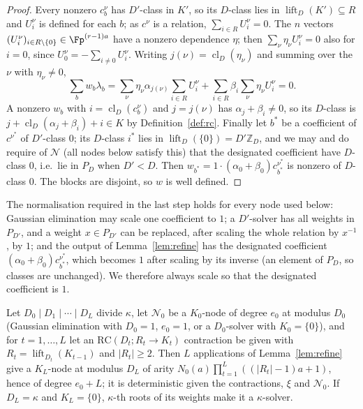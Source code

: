 \begin{proof}
Every nonzero $c^\nu_b$ has $D'$-class in $K'$, so its $D$-class lies in $\operatorname{lift}_D(K') \subseteq R$ and $U^\nu_i$ is defined for each $b$; as $c^\nu$ is a relation, $\sum_{i\in R}U^\nu_i = 0$. The $n$ vectors $(U^\nu_i)_{i \in R\setminus\{0\}} \in \Fp^{(r-1)a}$ have a nonzero dependence $\eta$; then $\sum_\nu\eta_\nu U^\nu_i = 0$ also for $i = 0$, since $U^\nu_0 = -\sum_{i\ne0}U^\nu_i$. Writing $j(\nu) = \operatorname{cl}_D(\eta_\nu)$ and summing over the $\nu$ with $\eta_\nu \ne 0$,
\[
  \sum_b w_b\lambda_b = \sum_\nu\eta_\nu\alpha_{j(\nu)}\sum_{i\in R}U^\nu_i + \sum_{i\in R}\beta_i\sum_\nu\eta_\nu U^\nu_i = 0 .
\]
A nonzero $w_b$ with $i = \operatorname{cl}_D(c^\nu_b)$ and $j = j(\nu)$ has $\alpha_j + \beta_i \ne 0$, so its $D$-class is $j + \operatorname{cl}_D(\alpha_j+\beta_i) + i \in K$ by Definition~\ref{def:rc}. Finally let $b^\ast$ be a coefficient of $c^{\nu^\ast}$ of $D'$-class $0$; its $D$-class $i^\ast$ lies in $\operatorname{lift}_D(\{0\}) = D'\mathbb{Z}_D$, and we may and do require of $\mathcal N$ (all nodes below satisfy this) that the designated coefficient have $D$-class $0$, i.e.\ lie in $P_D$ when $D' < D$. Then $w_{b^\ast} = 1\cdot(\alpha_0+\beta_0)c^{\nu^\ast}_{b^\ast}$ is nonzero of $D$-class $0$. The blocks are disjoint, so $w$ is well defined.
\end{proof}

\begin{remark}
\label{rem:designated}
The normalisation required in the last step holds for every node used below: Gaussian elimination may scale one coefficient to $1$; a $D'$-solver has all weights in $P_{D'}$, and a weight $x \in P_{D'}$ can be replaced, after scaling the whole relation by $x^{-1}$, by $1$; and the output of Lemma~\ref{lem:refine} has the designated coefficient $(\alpha_0+\beta_0)c^{\nu^\ast}_{b^\ast}$, which becomes $1$ after scaling by its inverse (an element of $P_D$, so classes are unchanged). We therefore always scale so that the designated coefficient is $1$.
\end{remark}

\begin{corollary}[Chains]
\label{cor:chain}
Let $D_0 \mid D_1 \mid \cdots \mid D_L$ divide $\kappa$, let $\mathcal N_0$ be a $K_0$-node of degree $e_0$ at modulus $D_0$ (Gaussian elimination with $D_0 = 1$, $e_0 = 1$, or a $D_0$-solver with $K_0 = \{0\}$), and for $t = 1,\dots,L$ let an $\mathrm{RC}(D_t;R_t\to K_t)$ contraction be given with $R_t = \operatorname{lift}_{D_t}(K_{t-1})$ and $|R_t| \ge 2$. Then $L$ applications of Lemma~\ref{lem:refine} give a $K_L$-node at modulus $D_L$ of arity $N_0(a)\prod_{t=1}^L((|R_t|-1)a+1)$, hence of degree $e_0 + L$; it is deterministic given the contractions, $\xi$ and $\mathcal N_0$. If $D_L = \kappa$ and $K_L = \{0\}$, $\kappa$-th roots of its weights make it a $\kappa$-solver.
\end{corollary}

